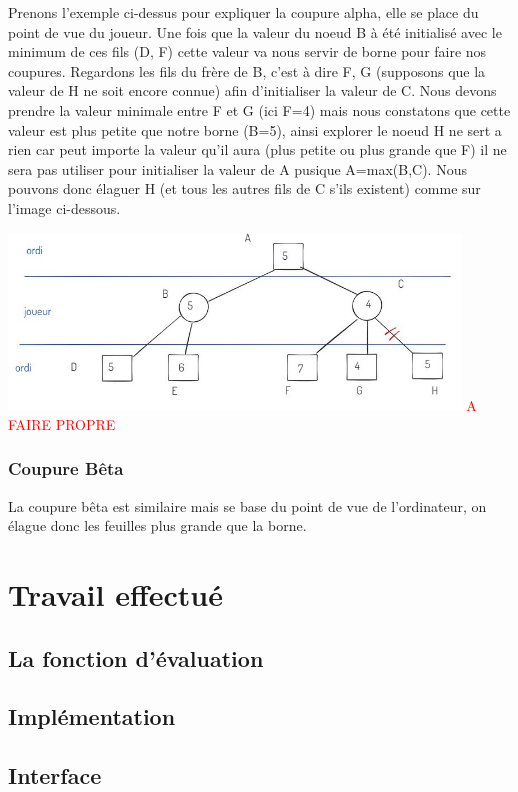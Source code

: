 \documentclass[a4paper, 12pt, french]{article}
\begin{document}
	Prenons l'exemple ci-dessus pour expliquer la coupure alpha, elle se place du point de vue du joueur.
	Une fois que la valeur du noeud B à été initialisé avec le minimum de ces fils (D, F) cette valeur va nous
	servir de borne pour faire nos coupures. Regardons les fils du frère de B, c'est à dire F, G (supposons que
	la valeur de H ne soit encore connue) afin d'initialiser la valeur de C. Nous devons prendre la valeur minimale
	entre F et G (ici F=4) mais nous constatons que cette valeur est plus petite que notre borne (B=5), ainsi explorer
	le noeud H ne sert a rien car peut importe la valeur qu'il aura (plus petite ou plus grande que F) il ne sera pas
	utiliser pour initialiser la valeur de A pusique A=max(B,C). Nous pouvons donc élaguer H (et tous les autres fils
	de C s'ils existent) comme sur l'image ci-dessous.

	\includegraphics[width=12cm]{images/elagageAlphaSuite.JPG}
	\textcolor{red}{A FAIRE PROPRE}

	\subsubsection{Coupure Bêta}
	La coupure bêta est similaire mais se base du point de vue de l'ordinateur, on élague donc les
	feuilles plus grande que la borne\cite{wiki_7_wonder}.

	\section{Travail effectué}
	\subsection{La fonction d'évaluation}
	\subsection{Implémentation}
	\subsection{Interface}
\end{document}
